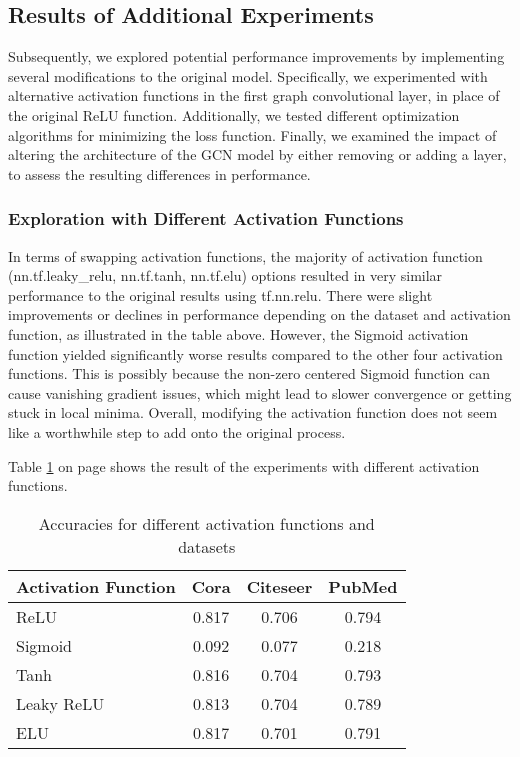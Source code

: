 \documentclass[11pt,a4paper]{article}
\begin{document}

\subsection{Results of Additional Experiments}

Subsequently, we explored potential performance improvements by implementing several modifications to the original model. Specifically, we experimented with alternative activation functions in the first graph convolutional layer, in place of the original ReLU function. Additionally, we tested different optimization algorithms for minimizing the loss function. Finally, we examined the impact of altering the architecture of the GCN model by either removing or adding a layer, to assess the resulting differences in performance.

\subsubsection{Exploration with Different Activation Functions}

In terms of swapping activation functions, the majority of activation function (nn.tf.leaky\_relu, nn.tf.tanh, nn.tf.elu) options resulted in very similar performance to the original results using tf.nn.relu. There were slight improvements or declines in performance depending on the dataset and activation function, as illustrated in the table above. However, the Sigmoid activation function yielded significantly worse results compared to the other four activation functions. This is possibly because the non-zero centered Sigmoid function can cause vanishing gradient issues, which might lead to slower convergence or getting stuck in local minima. Overall, modifying the activation function does not seem like a worthwhile step to add onto the original process.

Table \ref{table:activation-functions} on page \pageref{table:activation-functions} shows the result of the experiments with different activation functions.

\begin{table}[h]
  \centering
  \begin{tabular}{p{2cm}|c|c|c}
  \textbf{Activation Function} & \textbf{Cora} & \textbf{Citeseer} & \textbf{PubMed} \\ \hline
  ReLU        & 0.817 & 0.706 & 0.794 \\
  Sigmoid     & 0.092 & 0.077 & 0.218 \\
  Tanh        & 0.816 & 0.704 & 0.793 \\
  Leaky ReLU  & 0.813 & 0.704 & 0.789 \\
  ELU         & 0.817 & 0.701 & 0.791
  \end{tabular}
  \caption{Accuracies for different activation functions and datasets}
  \label{table:activation-functions}
\end{table}
\end{document}
